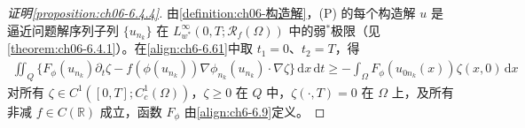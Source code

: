 \documentclass[../../main.tex]{subfiles}%
\begin{document}
\begin{proof}[证明\cref{proposition:ch06-6.4.4}]
由\cref{definition:ch06-构造解}，(P) 的每个构造解 $u$ 是逼近问题解序列子列 $\{u_{n_k}\}$ 在 $L^\infty_{w^*}(0,T;\mathscr{R}_f(\Omega))$ 中的弱$^*$极限（见\cref{theorem:ch06-6.4.1}）。在\eqref{align:ch6-6.61}中取 $t_1=0$、$t_2=T$，得
\begin{align}
\iint_Q\{F_\phi(u_{n_k})\partial_t\zeta-f(\phi(u_{n_k}))\nabla\phi_{n_k}(u_{n_k})\cdot\nabla\zeta\}\,\mathrm{d}x\,\mathrm{d}t
\geqslant-\int_\Omega F_\phi(u_{0n_k}(x))\zeta(x,0)\,\mathrm{d}x \label{align:ch6-6.126}
\end{align}
对所有 $\zeta\in C^1([0,T];C^1_c(\Omega))$，$\zeta\geqslant0$ 在 $Q$ 中，$\zeta(\cdot,T)=0$ 在 $\Omega$ 上，及所有非减 $f\in C(\mathbb{R})$ 成立，函数 $F_\phi$ 由\eqref{align:ch6-6.9}定义。


\end{proof}
\end{document}
